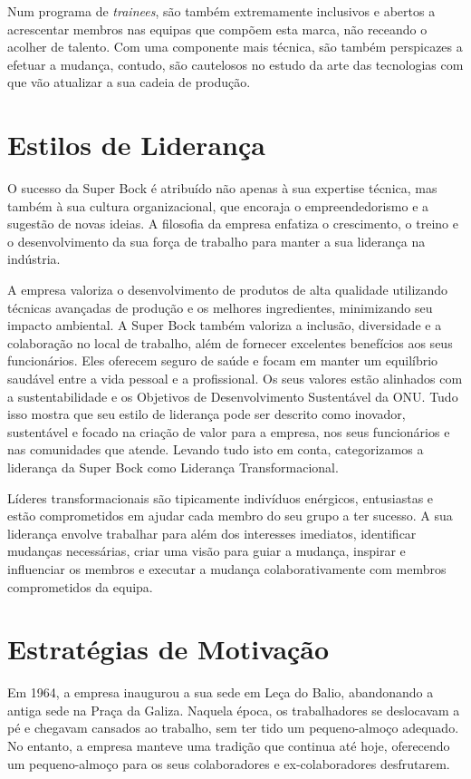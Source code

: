 Num programa de \textit{trainees}, são também extremamente inclusivos e abertos a acrescentar membros nas equipas que compõem esta marca, não receando o acolher de talento. Com uma componente mais técnica, são também perspicazes a efetuar a mudança, contudo, são cautelosos no estudo da arte das tecnologias com que vão atualizar a sua cadeia de produção. 

\section{Estilos de Liderança}

O sucesso da Super Bock é atribuído não apenas à sua expertise técnica, mas também à sua cultura organizacional, que encoraja o empreendedorismo e a sugestão de novas ideias. A filosofia da empresa enfatiza o crescimento, o treino e o desenvolvimento da sua força de trabalho para manter a sua liderança na indústria.

A empresa valoriza o desenvolvimento de produtos de alta qualidade utilizando técnicas avançadas de produção e os melhores ingredientes, minimizando seu impacto ambiental. A Super Bock também valoriza a inclusão, diversidade e a colaboração no local de trabalho, além de fornecer excelentes benefícios aos seus funcionários. Eles oferecem seguro de saúde e focam em manter um equilíbrio saudável entre a vida pessoal e a profissional. Os seus valores estão alinhados com a sustentabilidade e os Objetivos de Desenvolvimento Sustentável da ONU. Tudo isso mostra que seu estilo de liderança pode ser descrito como inovador, sustentável e focado na criação de valor para a empresa, nos seus funcionários e nas comunidades que atende. Levando tudo isto em conta, categorizamos a liderança da Super Bock como Liderança Transformacional.

Líderes transformacionais são tipicamente indivíduos enérgicos, entusiastas e estão comprometidos em ajudar cada membro do seu grupo a ter sucesso. A sua liderança envolve trabalhar para além dos interesses imediatos, identificar mudanças necessárias, criar uma visão para guiar a mudança, inspirar e influenciar os membros e executar a mudança colaborativamente com membros comprometidos da equipa.


\section{Estratégias de Motivação}

Em 1964, a empresa inaugurou a sua sede em Leça do Balio, abandonando a antiga sede na Praça da Galiza. Naquela época, os trabalhadores se deslocavam a pé e chegavam cansados ao trabalho, sem ter tido um pequeno-almoço adequado. No entanto, a empresa manteve uma tradição que continua até hoje, oferecendo um pequeno-almoço para os seus colaboradores e ex-colaboradores desfrutarem.


